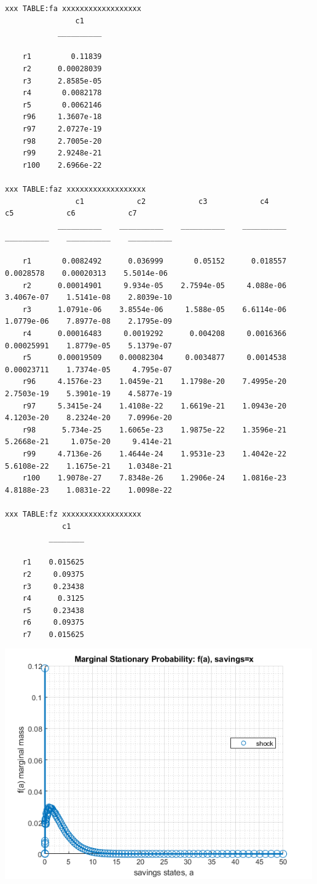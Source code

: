 \documentclass[
]{book}
\begin{document}
\begin{verbatim}
xxx TABLE:fa xxxxxxxxxxxxxxxxxx
                c1    
            __________

    r1         0.11839
    r2      0.00028039
    r3      2.8585e-05
    r4       0.0082178
    r5       0.0062146
    r96     1.3607e-18
    r97     2.0727e-19
    r98     2.7005e-20
    r99     2.9248e-21
    r100    2.6966e-22

xxx TABLE:faz xxxxxxxxxxxxxxxxxx
                c1            c2            c3            c4            c5            c6            c7    
            __________    __________    __________    __________    __________    __________    __________

    r1       0.0082492      0.036999       0.05152      0.018557     0.0028578    0.00020313    5.5014e-06
    r2      0.00014901     9.934e-05    2.7594e-05     4.088e-06    3.4067e-07    1.5141e-08    2.8039e-10
    r3      1.0791e-06    3.8554e-06     1.588e-05    6.6114e-06    1.0779e-06    7.8977e-08    2.1795e-09
    r4      0.00016483     0.0019292      0.004208     0.0016366    0.00025991    1.8779e-05    5.1379e-07
    r5      0.00019509    0.00082304     0.0034877     0.0014538    0.00023711    1.7374e-05     4.795e-07
    r96     4.1576e-23    1.0459e-21    1.1798e-20    7.4995e-20    2.7503e-19    5.3901e-19    4.5877e-19
    r97     5.3415e-24    1.4108e-22    1.6619e-21    1.0943e-20    4.1203e-20    8.2324e-20    7.0996e-20
    r98      5.734e-25    1.6065e-23    1.9875e-22    1.3596e-21    5.2668e-21     1.075e-20     9.414e-21
    r99     4.7136e-26    1.4644e-24    1.9531e-23    1.4042e-22    5.6108e-22    1.1675e-21    1.0348e-21
    r100    1.9078e-27    7.8348e-26    1.2906e-24    1.0816e-23    4.8188e-23    1.0831e-22    1.0098e-22

xxx TABLE:fz xxxxxxxxxxxxxxxxxx
             c1   
          ________

    r1    0.015625
    r2     0.09375
    r3     0.23438
    r4      0.3125
    r5     0.23438
    r6     0.09375
    r7    0.015625
\end{verbatim}

\includegraphics[width=5.20833in,height=\textheight]{img/fx_ds_az_cts_loop_images/figure_0.png}
\end{document}
